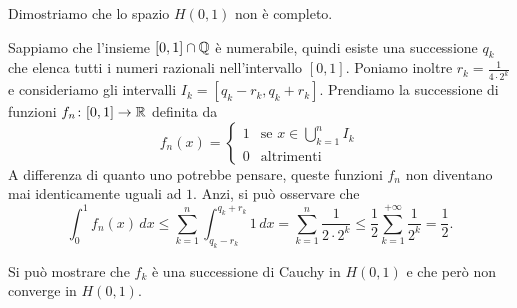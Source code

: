 \begin{example}
\label{ex:incompletezza_di_H}%
Dimostriamo che lo spazio $H(0,1)$ non è completo.

Sappiamo che l'insieme $[0,1]\cap {\mathbb Q}$ è numerabile, quindi esiste una
successione $q_k$ che elenca tutti i numeri razionali nell'intervallo $[0,1]$.
Poniamo inoltre $r_k = \frac{1}{4\cdot 2^k}$ e consideriamo gli intervalli
$I_k = [q_k-r_k,q_k+r_k]$.
Prendiamo la successione di funzioni $f_n\colon [0,1]\to {\mathbb R}$
definita da
\[
  f_n(x) =
  \begin{cases}
  1 &\text{se } x\in\displaystyle\bigcup_{k=1}^{n} I_k\\
  0 & \text{altrimenti}
  \end{cases}
\]
A differenza di quanto uno potrebbe pensare, queste funzioni $f_n$ non diventano
mai identicamente uguali ad $1$. Anzi, si può osservare che
\[
  \int_0^1 f_n(x)\, dx
  \le \sum_{k=1}^n \int_{q_k-r_k}^{q_k+r_k} 1\, dx
  = \sum_{k=1}^n \frac{1}{2\cdot 2^k}
  \le \frac{1}{2}\sum_{k=1}^{+\infty}\frac{1}{2^k} = \frac 1 2.
\]

Si può mostrare che $f_k$ è una successione di Cauchy in $H(0,1)$ e
che però non converge in $H(0,1)$.
\end{example}

